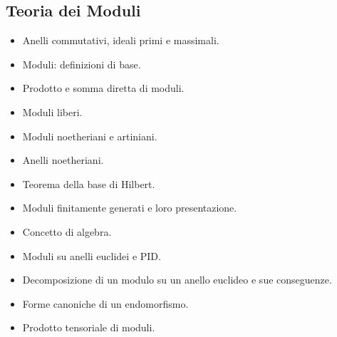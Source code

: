 \subsection*{Teoria dei Moduli}
\begin{itemize}
	\item Anelli commutativi, ideali primi e massimali. 
	\item Moduli: definizioni di base. 
	\item Prodotto e somma diretta di moduli. 
	\item Moduli liberi. 
	\item Moduli noetheriani e artiniani. 
	\item Anelli noetheriani. 
	\item Teorema della base di Hilbert. 
	\item Moduli finitamente generati e loro presentazione. 
	\item Concetto di algebra. 
	\item Moduli su anelli euclidei e PID. 
	\item Decomposizione di un modulo su un anello euclideo e sue conseguenze. 
	\item Forme canoniche di un endomorfismo. 
	\item Prodotto tensoriale di moduli.
\end{itemize}
